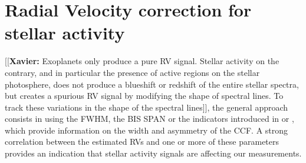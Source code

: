 \documentclass{aa}
\newcommand{\xavier}[1]{{\color{blue}[[\textbf{Xavier: }#1]]}}
\begin{document}
\section{Radial Velocity correction for stellar activity} \label{sec:31}

\xavier{Exoplanets only produce a pure RV signal. Stellar activity on the contrary, and in particular the presence of active regions on the stellar photosphere, does not produce a blueshift or redshift of the entire stellar spectra, but creates a spurious RV signal by modifying the shape of spectral lines. To track these variations in the shape of the spectral lines}, the general approach consists in using the FWHM, the BIS SPAN or the indicators introduced in \citet{Boisse-2011} or \citet{Figueira-2013}, which provide information on the width and asymmetry of the CCF. A strong correlation between the estimated RVs and one or more of these parameters provides an indication that stellar activity signals are affecting our measurements.
\end{document}
